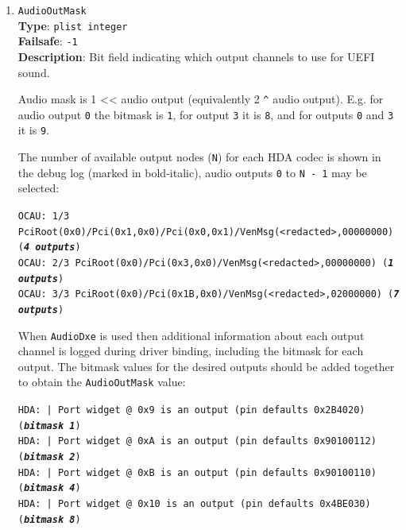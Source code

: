 \documentclass[]{article}
\begin{document}
\begin{enumerate}
  \texttt{HDA: Connecting controller - \textit{\textbf{PciRoot(0x0)/Pci(0x1B,0x0)}}}

  Finally, \texttt{gfxutil -f HDEF} command can be used in macOS to obtain the device path.

  Specifying an empty device path results in the first available codec and audio controller being used. The value
  of \texttt{AudioCodec} is ignored in this case. This can be a convenient initial option to try to get UEFI
  audio working. Manual settings as above will be required when this default value does not work.

\item
  \texttt{AudioOutMask}\\
  \textbf{Type}: \texttt{plist\ integer}\\
  \textbf{Failsafe}: \texttt{-1}\\
  \textbf{Description}: Bit field indicating which output channels to use for UEFI sound.

  Audio mask is 1 << audio output (equivalently 2 \texttt{\^{}} audio output). E.g. for audio output \texttt{0} the bitmask is
  \texttt{1}, for output \texttt{3} it is \texttt{8}, and for outputs \texttt{0} and \texttt{3} it is \texttt{9}.

  The number of available output nodes (\texttt{N}) for each HDA codec is shown in the debug log (marked in bold-italic),
  audio outputs \texttt{0} to \texttt{N - 1} may be selected:

  \texttt{OCAU: 1/3 PciRoot(0x0)/Pci(0x1,0x0)/Pci(0x0,0x1)/VenMsg(<redacted>,00000000) (\textit{\textbf{4 outputs}})}\\
  \texttt{OCAU: 2/3 PciRoot(0x0)/Pci(0x3,0x0)/VenMsg(<redacted>,00000000) (\textit{\textbf{1 outputs}})}\\
  \texttt{OCAU: 3/3 PciRoot(0x0)/Pci(0x1B,0x0)/VenMsg(<redacted>,02000000) (\textit{\textbf{7 outputs}})}

  When \texttt{AudioDxe} is used then additional information about each output channel is logged during driver binding,
  including the bitmask for each output. The bitmask values for the desired outputs should be added together to
  obtain the \texttt{AudioOutMask} value:

  \texttt{HDA:  | Port widget @ 0x9 is an output (pin defaults 0x2B4020) (\textit{\textbf{bitmask 1}})}\\
  \texttt{HDA:  | Port widget @ 0xA is an output (pin defaults 0x90100112) (\textit{\textbf{bitmask 2}})}\\
  \texttt{HDA:  | Port widget @ 0xB is an output (pin defaults 0x90100110) (\textit{\textbf{bitmask 4}})}\\
  \texttt{HDA:  | Port widget @ 0x10 is an output (pin defaults 0x4BE030) (\textit{\textbf{bitmask 8}})}


\end{enumerate}
\end{document}
